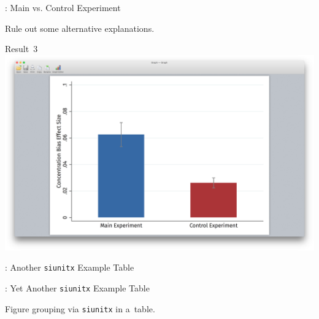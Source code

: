 \begin{frame}{\titleprefix: Main vs. Control Experiment}

	Rule out some alternative explanations.
	
	\bigskip
	
	\centering
	{\small \alert{Result~3}} \\[15pt]
	\includegraphics[height=0.5\textheight, trim={3.75in 1.75in 3.75in 2in}, clip]
		{1_Example_Content/Images/average_main_control.png}

\end{frame}


\begin{frame}{\titleprefix: Another \texttt{siunitx} Example Table}

	\begin{table}
	\caption{%
		Example of a~regression table \citep[adapted from][]{Gerhardt2017}.
		Never forget to mention the dependent variable!%
	}
	\label{tab:lin_reg_interactions}
	\resizebox*{!}{0.59\textheight}{%
		
	}
	\end{table}

\end{frame}


\begin{frame}{\titleprefix: Yet Another \texttt{siunitx} Example Table}

	\begin{table}
		\caption{Figure grouping via \texttt{siunitx} in a~table.}
		
	\end{table}

\end{frame}



